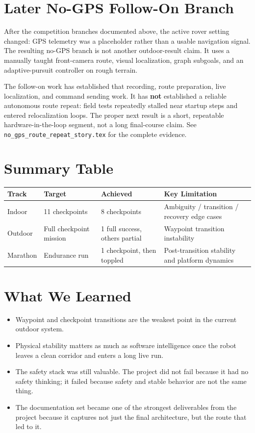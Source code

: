 \documentclass[11pt]{article}
\begin{document}
\section{Later No-GPS Follow-On Branch}

After the competition branches documented above, the active rover setting
changed: GPS telemetry was a placeholder rather than a usable navigation signal.
The resulting no-GPS branch is not another outdoor-result claim. It uses a
manually taught front-camera route, visual localization, graph subgoals, and an
adaptive-pursuit controller on rough terrain.

The follow-on work has established that recording, route preparation, live
localization, and command sending work. It has \textbf{not} established a
reliable autonomous route repeat: field tests repeatedly stalled near startup
steps and entered relocalization loops. The proper next result is a short,
repeatable hardware-in-the-loop segment, not a long final-course claim. See
\texttt{no\_gps\_route\_repeat\_story.tex} for the complete evidence.

\section{Summary Table}

\begin{center}
\begin{tabular}{llll}
\toprule
\textbf{Track} & \textbf{Target} & \textbf{Achieved} & \textbf{Key Limitation} \\
\midrule
Indoor & 11 checkpoints & 8 checkpoints & Ambiguity / transition / recovery edge cases \\
Outdoor & Full checkpoint mission & 1 full success, others partial & Waypoint transition instability \\
Marathon & Endurance run & 1 checkpoint, then toppled & Post-transition stability and platform dynamics \\
\bottomrule
\end{tabular}
\end{center}

\section{What We Learned}

\begin{itemize}[nosep]
  \item Waypoint and checkpoint transitions are the weakest point in the current
  outdoor system.
  \item Physical stability matters as much as software intelligence once the robot
  leaves a clean corridor and enters a long live run.
  \item The safety stack was still valuable. The project did not fail because it had
  no safety thinking; it failed because safety and stable behavior are not the same
  thing.
  \item The documentation set became one of the strongest deliverables from the
  project because it captures not just the final architecture, but the route that
  led to it.
\end{itemize}
\end{document}
